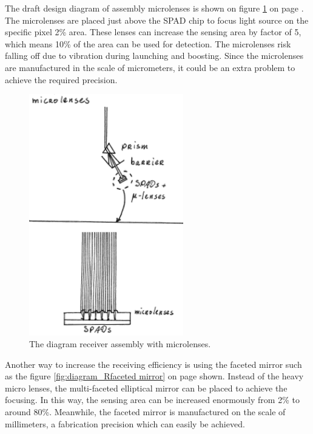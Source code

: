 The draft design diagram of assembly microlenses is shown on figure \ref{fig:diagram_Rmicrolenses} on page \pageref{fig:diagram_Rmicrolenses}. The microlenses are placed just above the \acs{SPAD} chip to focus light source on the specific pixel 2\% area. These lenses can increase the sensing area by factor of 5, which means 10\% of the area can be used for detection. The microlenses risk falling off due to vibration during launching and boosting. Since the microlenses are manufactured in the scale of micrometers, it could be an extra problem to achieve the required precision.

\begin{figure}[ht!]
\centering
\includegraphics[width=0.6\textwidth]{chapters/img/DiagramReceiverAssemblyMicrolenses.png}
\caption{The diagram receiver assembly with microlenses.}
\label{fig:diagram_Rmicrolenses}
\end{figure}

Another way to increase the receiving efficiency is using the faceted mirror such as the figure \ref{fig:diagram_Rfaceted mirror} on page \pageref{fig:diagram_Rfaceted mirror} shown. Instead of the heavy micro lenses, the multi-faceted elliptical mirror can be placed to achieve the focusing. In this way, the sensing area can be increased enormously from 2\% to around 80\%. Meanwhile, the faceted mirror is manufactured on the scale of millimeters, a fabrication precision which can easily be achieved.

